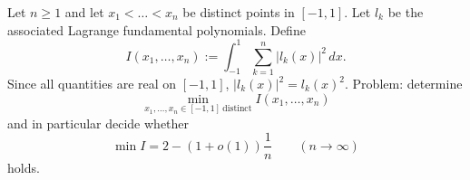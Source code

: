 Let $n\ge 1$ and let $x_1<\dots<x_n$ be distinct points in $[-1,1]$.
Let $l_k$ be the associated Lagrange fundamental polynomials.
Define
\[
I(x_1,\dots,x_n):=\int_{-1}^1\sum_{k=1}^n |l_k(x)|^2\,dx.
\]
Since all quantities are real on $[-1,1]$, $|l_k(x)|^2=l_k(x)^2$.
Problem: determine
\[
\min_{x_1,\dots,x_n\in[-1,1]\ \text{distinct}} I(x_1,\dots,x_n)
\]
and in particular decide whether
\[
\min I = 2-(1+o(1))\frac{1}{n}\qquad (n\to\infty)
\]
holds.
